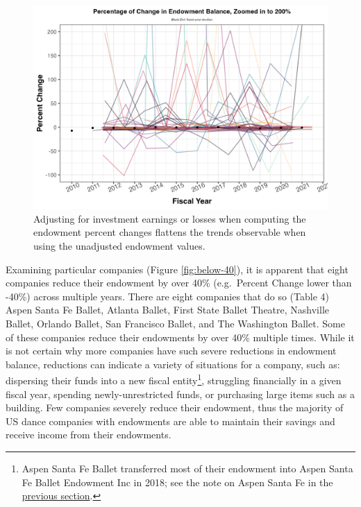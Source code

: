 \documentclass[Dance Data
Project,article,submit,moreauthors,pdftex]{mdpi}
\begin{document}
\begin{figure}[H]
\includegraphics[width=0.8\linewidth,]{../images/pc_endow_flat} \caption{\label{fig:flat} Adjusting for investment earnings or losses when computing the endowment percent changes flattens the trends observable when using the unadjusted endowment values.}\label{fig:flat}
\end{figure}

Examining particular companies (Figure \ref{fig:below-40}), it is
apparent that eight companies reduce their endowment by over 40\%
(e.g.~Percent Change lower than -40\%) across multiple years. There are
eight companies that do so (Table 4) Aspen Santa Fe Ballet, Atlanta
Ballet, First State Ballet Theatre, Nashville Ballet, Orlando Ballet,
San Francisco Ballet, and The Washington Ballet. Some of these companies
reduce their endowments by over 40\% multiple times. While it is not
certain why more companies have such severe reductions in endowment
balance, reductions can indicate a variety of situations for a company,
such as: dispersing their funds into a new fiscal entity\footnote{Aspen
  Santa Fe Ballet transferred most of their endowment into Aspen Santa
  Fe Ballet Endowment Inc in 2018; see the note on Aspen Santa Fe in the
  \protect\hyperlink{asfb}{previous section}.}, struggling financially
in a given fiscal year, spending newly-unrestricted funds, or purchasing
large items such as a building. Few companies severely reduce their
endowment, thus the majority of US dance companies with endowments are
able to maintain their savings and receive income from their endowments.
\end{document}
